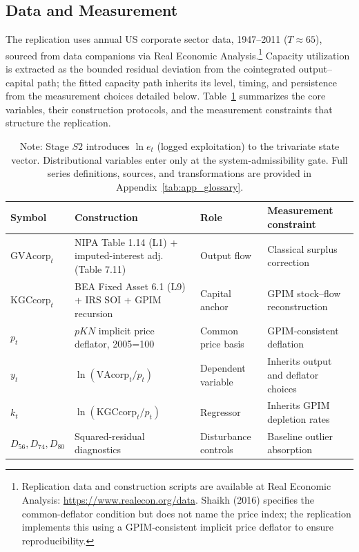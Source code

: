 \documentclass[11pt]{article}
\begin{document}
\subsection{Data and Measurement}
\label{subsec:data_measurement}

The replication uses annual US corporate sector data, 1947--2011 ($T \approx 65$), sourced from \citet{Shaikh2016} data companions via Real Economic Analysis.\footnote{Replication data and construction scripts are available at Real Economic Analysis: \url{https://www.realecon.org/data}. Shaikh (2016) specifies the common-deflator condition but does not name the price index; the replication implements this using a GPIM-consistent implicit price deflator to ensure reproducibility.} Capacity utilization is extracted as the bounded residual deviation from the cointegrated output--capital path; the fitted capacity path inherits its level, timing, and persistence from the measurement choices detailed below. Table~\ref{tab:variables_replication} summarizes the core variables, their construction protocols, and the measurement constraints that structure the replication.

\begin{table}[H]
\centering
\caption{Core replication variables: symbols, sources, and transformations}
\label{tab:variables_replication}
\small
\begin{tabular}{@{}>{\raggedright\arraybackslash}p{2.8cm}>{\raggedright\arraybackslash}p{4.5cm}>{\raggedright\arraybackslash}p{2.2cm}>{\raggedright\arraybackslash}p{3.2cm}@{}}
\toprule
Symbol & Construction & Role & Measurement constraint \\
\midrule
$\text{GVAcorp}_t$ & NIPA Table 1.14 (L1) + imputed-interest adj. (Table 7.11) & Output flow & Classical surplus correction \\
$\text{KGCcorp}_t$ & BEA Fixed Asset 6.1 (L9) + IRS SOI + GPIM recursion & Capital anchor & GPIM stock--flow reconstruction \\
$p_t$ & $pKN$ implicit price deflator, 2005=100 & Common price basis & GPIM-consistent deflation \\
$y_t$ & $\ln(\text{VAcorp}_t/p_t)$ & Dependent variable & Inherits output and deflator choices \\
$k_t$ & $\ln(\text{KGCcorp}_t/p_t)$ & Regressor & Inherits GPIM depletion rates \\
$D_{56},D_{74},D_{80}$ & Squared-residual diagnostics  & Disturbance controls & Baseline outlier absorption \\
\bottomrule
\end{tabular}
\caption*{Note: Stage $S2$ introduces $\ln e_t$ (logged exploitation) to the trivariate state vector. Distributional variables enter only at the system-admissibility gate. Full series definitions, sources, and transformations are provided in Appendix~\ref{tab:app_glossary}.}
\end{table}
\end{document}
